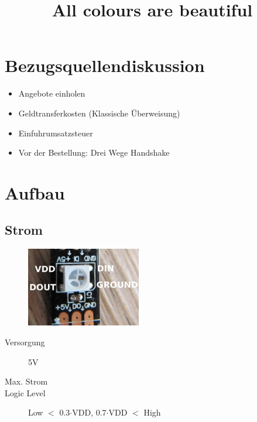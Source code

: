 \documentclass{beamer}
\title{All colours are beautiful}
\institute{MetaMeute}
\begin{document}
\begin{frame}
 \maketitle
\end{frame}

\section{Bezugsquellendiskussion}
\begin{frame}
\begin{itemize}
 \item Angebote einholen
 \item Geldtransferkosten (Klassische Überweisung)
 \item Einfuhrumsatzsteuer
 \item Vor der Bestellung: Drei Wege Handshake
\end{itemize}
\end{frame}

\section{Aufbau}
\subsection{Strom}
\begin{frame}
\begin{figure}[h]
 \centering
 \includegraphics[width=5cm,keepaspectratio=true]{./WS2812B_CloseUp.png}
\end{figure}

\begin{description}
\item[Versorgung] 5V
\item[Max. Strom]
\item[Logic Level] Low  $<$ 0.3$\cdot$VDD, 0.7$\cdot$VDD $<$ High
\end{description}

\end{frame}
\end{document}
